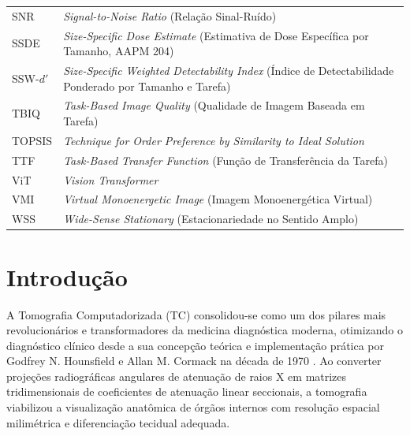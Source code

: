 \documentclass[
  12pt,
  a4paper,
  oneside
]{report}
\begin{document}
\begin{longtable}{p{}p{}}
  SNR    & \emph{Signal-to-Noise Ratio} (Relação Sinal-Ruído) \\
  SSDE   & \emph{Size-Specific Dose Estimate} (Estimativa de Dose Específica por Tamanho, AAPM 204) \\
  SSW-$d'$ & \emph{Size-Specific Weighted Detectability Index} (Índice de Detectabilidade Ponderado por Tamanho e Tarefa) \\
  TBIQ   & \emph{Task-Based Image Quality} (Qualidade de Imagem Baseada em Tarefa) \\
  TOPSIS & \emph{Technique for Order Preference by Similarity to Ideal Solution} \\
  TTF    & \emph{Task-Based Transfer Function} (Função de Transferência da Tarefa) \\
  ViT    & \emph{Vision Transformer} \\
  VMI    & \emph{Virtual Monoenergetic Image} (Imagem Monoenergética Virtual) \\
  WSS    & \emph{Wide-Sense Stationary} (Estacionariedade no Sentido Amplo)
\end{longtable}
\clearpage

\tableofcontents
\clearpage

\pagestyle{fancy}
\setcounter{page}{1}

\chapter{Introdução}
\label{chap:introducao}

A Tomografia Computadorizada (TC) consolidou-se como um dos pilares mais revolucionários e transformadores da medicina diagnóstica moderna, otimizando o diagnóstico clínico desde a sua concepção teórica e implementação prática por Godfrey N. Hounsfield e Allan M. Cormack na década de 1970 \cite{bushberg2020, attix1986, seeram2015}. Ao converter projeções radiográficas angulares de atenuação de raios X em matrizes tridimensionais de coeficientes de atenuação linear seccionais, a tomografia viabilizou a visualização anatômica de órgãos internos com resolução espacial milimétrica e diferenciação tecidual adequada.
\end{document}
